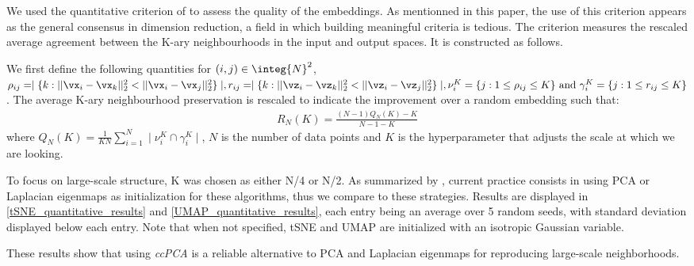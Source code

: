 We used the quantitative criterion of \citep{lee2015multi} to assess the quality of the embeddings. As mentionned in this paper, the use of this criterion appears as the general consensus in dimension reduction, a field in which building meaningful criteria is tedious. The criterion measures the rescaled average agreement between the K-ary neighbourhoods in the input and output spaces. It is constructed as follows.

We first define the following quantities for $(i,j) \in \integ{N}^2$,
$\rho_{ij} = \mid \{ k: ||\vx_i - \vx_k ||^2_2 < ||\vx_i - \vx_j ||^2_2 \} \mid, r_{ij} = \mid \{ k: ||\vz_i - \vz_k ||^2_2 < ||\vz_i - \vz_j ||^2_2 \} \mid, \nu_i^K = \{ j : 1 \leq \rho_{ij} \leq K \} \text{ and } \gamma_i^K = \{ j : 1 \leq r_{ij} \leq K \}$. The average K-ary neighbourhood preservation is rescaled to indicate the improvement over a random embedding such that:
\begin{align}\label{def_R}
R_{N}(K) = \frac{(N-1) Q_{N}(K) - K }{N-1-K}
\end{align}
where $Q_{N}(K) = \frac{1}{KN} \sum_{i=1}^N \mid \nu_i^K \cap \gamma_i^K \mid$, $N$ is the number of data points and $K$ is the hyperparameter that adjusts the scale at which we are looking.

To focus on large-scale structure, K was chosen as either N/4 or N/2. As summarized by \citep{kobak2021initialization}, current practice consists in using PCA or Laplacian eigenmaps as initialization for these algorithms, thus we compare to these strategies. Results are displayed in \cref{tSNE_quantitative_results} and \cref{UMAP_quantitative_results}, each entry being an average over 5 random seeds, with standard deviation displayed below each entry. Note that when not specified, tSNE and UMAP are initialized with an isotropic Gaussian variable. 

These results show that using \textit{ccPCA} is a reliable alternative to PCA and Laplacian eigenmaps for reproducing large-scale neighborhoods.

\vspace{2cm}

